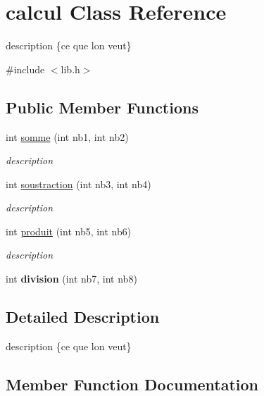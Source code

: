 \hypertarget{classcalcul}{}\section{calcul Class Reference}
\label{classcalcul}


description \{ce que l\textquotesingle{}on veut\}  




{\ttfamily \#include $<$lib.\+h$>$}

\subsection*{Public Member Functions}
\begin{DoxyCompactItemize}
\item 
int \hyperlink{classcalcul_aaab5926fb2fc504a256b9a91a3111875}{somme} (int nb1, int nb2)
\begin{DoxyCompactList}\small\item\em description \end{DoxyCompactList}\item 
int \hyperlink{classcalcul_ae3eabefedbbd53ef7ffa2da8e1e33193}{soustraction} (int nb3, int nb4)
\begin{DoxyCompactList}\small\item\em description \end{DoxyCompactList}\item 
int \hyperlink{classcalcul_ab12e7f4ab0c7ce3966c521df77476d9c}{produit} (int nb5, int nb6)
\begin{DoxyCompactList}\small\item\em description \end{DoxyCompactList}\item 
\mbox{\label{classcalcul_a2cb2b2fff7c092ee4059a69391e0c1f2}} 
int {\bfseries division} (int nb7, int nb8)
\end{DoxyCompactItemize}


\subsection{Detailed Description}
description \{ce que l\textquotesingle{}on veut\} 

\subsection{Member Function Documentation}
\mbox{\label{classcalcul_ab12e7f4ab0c7ce3966c521df77476d9c}} 
